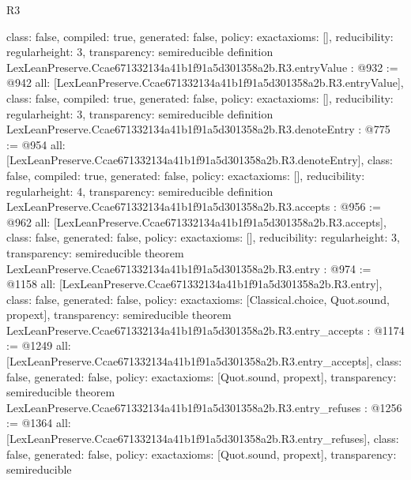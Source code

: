 \begin{lexlean}{R3}
\begin{coremodule}
{  class: false,
  compiled: true,
  generated: false,
  policy: exact{axioms: []},
  reducibility: regular{height: 3},
  transparency: semireducible
}
definition LexLeanPreserve.Ccae671332134a41b1f91a5d301358a2b.R3.entryValue : @932 := @942 {
  all: [LexLeanPreserve.Ccae671332134a41b1f91a5d301358a2b.R3.entryValue],
  class: false,
  compiled: true,
  generated: false,
  policy: exact{axioms: []},
  reducibility: regular{height: 3},
  transparency: semireducible
}
definition LexLeanPreserve.Ccae671332134a41b1f91a5d301358a2b.R3.denoteEntry : @775 := @954 {
  all: [LexLeanPreserve.Ccae671332134a41b1f91a5d301358a2b.R3.denoteEntry],
  class: false,
  compiled: true,
  generated: false,
  policy: exact{axioms: []},
  reducibility: regular{height: 4},
  transparency: semireducible
}
definition LexLeanPreserve.Ccae671332134a41b1f91a5d301358a2b.R3.accepts : @956 := @962 {
  all: [LexLeanPreserve.Ccae671332134a41b1f91a5d301358a2b.R3.accepts],
  class: false,
  generated: false,
  policy: exact{axioms: []},
  reducibility: regular{height: 3},
  transparency: semireducible
}
theorem LexLeanPreserve.Ccae671332134a41b1f91a5d301358a2b.R3.entry : @974 := @1158 {
  all: [LexLeanPreserve.Ccae671332134a41b1f91a5d301358a2b.R3.entry],
  class: false,
  generated: false,
  policy: exact{axioms: [Classical.choice, Quot.sound, propext]},
  transparency: semireducible
}
theorem LexLeanPreserve.Ccae671332134a41b1f91a5d301358a2b.R3.entry_accepts : @1174 := @1249 {
  all: [LexLeanPreserve.Ccae671332134a41b1f91a5d301358a2b.R3.entry_accepts],
  class: false,
  generated: false,
  policy: exact{axioms: [Quot.sound, propext]},
  transparency: semireducible
}
theorem LexLeanPreserve.Ccae671332134a41b1f91a5d301358a2b.R3.entry_refuses : @1256 := @1364 {
  all: [LexLeanPreserve.Ccae671332134a41b1f91a5d301358a2b.R3.entry_refuses],
  class: false,
  generated: false,
  policy: exact{axioms: [Quot.sound, propext]},
  transparency: semireducible
}


\end{coremodule}
\end{lexlean}
